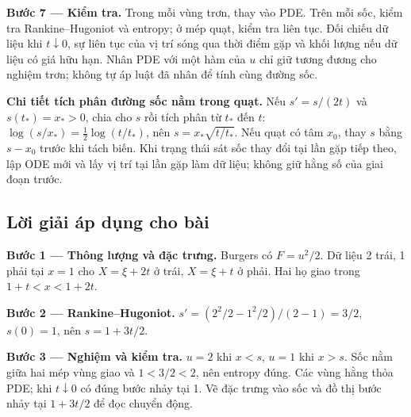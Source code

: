 \documentclass[10pt,a4paper]{article}
\begin{document}
\textbf{Bước 7 — Kiểm tra.} Trong mỗi vùng trơn, thay vào PDE. Trên mỗi sốc, kiểm tra Rankine–Hugoniot và entropy; ở mép quạt, kiểm tra liên tục. Đối chiếu dữ liệu khi $t\downarrow0$, sự liên tục của vị trí sóng qua thời điểm gặp và khối lượng nếu dữ liệu có giá hữu hạn. Nhân PDE với một hàm của $u$ chỉ giữ tương đương cho nghiệm trơn; không tự áp luật đã nhân để tính cùng đường sốc.

\textbf{Chi tiết tích phân đường sốc nằm trong quạt.} Nếu $s'=s/(2t)$ và $s(t_*)=x_*>0$, chia cho $s$ rồi tích phân từ $t_*$ đến $t$: $\log(s/x_*)=\frac12\log(t/t_*)$, nên $s=x_*\sqrt{t/t_*}$. Nếu quạt có tâm $x_0$, thay $s$ bằng $s-x_0$ trước khi tách biến. Khi trạng thái sát sốc thay đổi tại lần gặp tiếp theo, lập ODE mới và lấy vị trí tại lần gặp làm dữ liệu; không giữ hằng số của giai đoạn trước.
\subsection*{Lời giải áp dụng cho bài}
\textbf{Bước 1 — Thông lượng và đặc trưng.} Burgers có $F=u^2/2$. Dữ liệu 2 trái, 1 phải tại $x=1$ cho $X=\xi+2t$ ở trái, $X=\xi+t$ ở phải. Hai họ giao trong $1+t<x<1+2t$.

\textbf{Bước 2 — Rankine–Hugoniot.} $s'=(2^2/2-1^2/2)/(2-1)=3/2$, $s(0)=1$, nên $s=1+3t/2$.

\textbf{Bước 3 — Nghiệm và kiểm tra.} $u=2$ khi $x<s$, $u=1$ khi $x>s$. Sốc nằm giữa hai mép vùng giao và $1<3/2<2$, nên entropy đúng. Các vùng hằng thỏa PDE; khi $t\downarrow0$ có đúng bước nhảy tại 1. Vẽ đặc trưng vào sốc và đồ thị bước nhảy tại $1+3t/2$ để đọc chuyển động.
\end{document}
